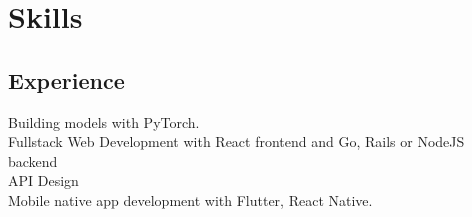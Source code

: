 \documentclass[]{deedy-resume-openfont}
\begin{document}
%
%

%
%



%
%

\begin{minipage}[t]{0.25\textwidth}




\section{Skills}
\subsection{Experience}
Building models with PyTorch. \\
Fullstack Web Development with React frontend and Go, Rails or NodeJS backend\\
API Design\\
Mobile native app development with Flutter, React Native.
\sectionsep



\end{minipage}
\end{document}
